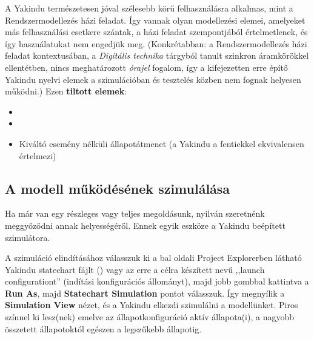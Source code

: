\begin{figyelmeztetes}
A Yakindu természetesen jóval szélesebb körű felhasználásra alkalmas, mint a Rendszermodellezés házi feladat. Így vannak olyan modellezési elemei, amelyeket más felhasználási esetkere szántak, a házi feladat szempontjából értelmetlenek, és így használatukat nem engedjük meg. (Konkrétabban: a Rendszermodellezés házi feladat kontextusában, a \emph{Digitális technika} tárgyból tanult szinkron áramkörökkel ellentétben, nincs meghatározott \emph{órajel} fogalom, így a kifejezetten erre építő Yakindu nyelvi elemek a szimulációban és tesztelés közben nem fognak helyesen működni.) Ezen \textbf{tiltott elemek}:

\begin{itemize}
	\item {}
	\item {}
	\item Kiváltó esemény nélküli állapotátmenet (a Yakindu a fentiekkel ekvivalensen értelmezi)
\end{itemize}
\end{figyelmeztetes}

\begin{comment}
A \emph{default} ablakrészben tudjuk megadni az interface-eket, illetve a modellezéshez szükséges alapokat. A jobb oldali eszköztárral tudunk hozzáadni az ábrához újabb állapotokat, illetve onnan érünk el mindent, ami a modellezéshez szükséges.
\end{comment}


\subsection{A modell működésének szimulálása}
Ha már van egy részleges vagy teljes megoldásunk, nyilván szeretnénk meggyőződni annak helyességéről. Ennek egyik eszköze a Yakindu beépített szimulátora.

A szimuláció elindításához válasszuk ki a bal oldali Project Explorerben látható Yakindu statechart fájlt () vagy az erre a célra készített  nevű ,,launch configurationt'' (indítási konfigurációs állományt), majd jobb gombbal kattintva a \textbf{Run As}, majd \textbf{Statechart Simulation} pontot válasszuk. Így megnyílik a \textbf{Simulation View} nézet, és a Yakindu elkezdi szimulálni a modellünket. Piros színnel ki lesz(nek) emelve az állapotkonfiguráció aktív állapota(i), a nagyobb összetett állapotoktól egészen a legszűkebb állapotig.

